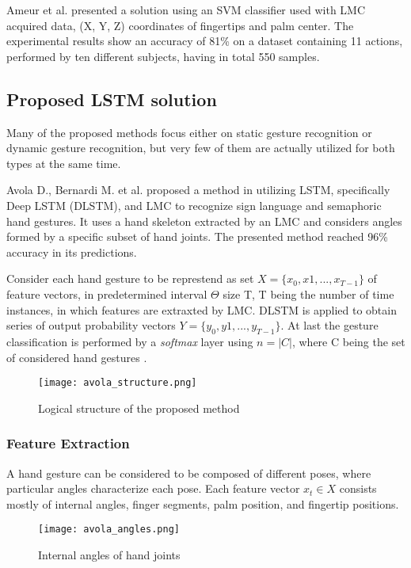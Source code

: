 Ameur et al. \cite{ameur} presented a solution using an SVM classifier used with LMC acquired data, (X, Y, Z) coordinates of fingertips and palm center. The experimental results show an accuracy of 81\% on a dataset containing 11 actions, performed by ten different subjects, having in total 550 samples.

\subsection{Proposed LSTM solution}

Many of the proposed methods focus either on static gesture recognition or dynamic gesture recognition, but very few of them are actually utilized for both types at the same time. 

Avola D., Bernardi M. et al. proposed a method in \cite{avola} utilizing LSTM, specifically Deep LSTM (DLSTM), and LMC to recognize sign language and semaphoric hand gestures. It uses a hand skeleton extracted by an LMC and considers angles formed by a specific subset of hand joints. The presented method reached 96\% accuracy in its predictions.

Consider each hand gesture to be represtend as set $X = \{x_0, x1, ..., x_{T-1}\}$ of feature vectors, in predetermined interval $\Theta$ size T, T being the number of time instances, in which features are extraxted by LMC. DLSTM is applied to obtain series of output probability vectors $Y = \{y_0, y1, ..., y_{T-1}\}$. At last the gesture classification is performed by a \textit{softmax} layer using $n = |C|$, where C being the set of considered hand gestures \cite{avola}.

\begin{figure}[ht]
	\centering
    \texttt{[image: avola\_structure.png]}
	\caption{Logical structure of the proposed method \cite{avola}}
	\label{fig:lstm_gesture_structure}
\end{figure}

\subsubsection{Feature Extraction}

A hand gesture can be considered to be composed of different poses, where particular angles characterize each pose. Each feature vector $x_t \in X$ consists mostly of internal angles, finger segments, palm position, and fingertip positions.

\begin{figure}[ht]
	\centering
    \texttt{[image: avola\_angles.png]}
	\caption{Internal angles of hand joints \cite{avola}}
	\label{fig:lstm_angles}
\end{figure}

